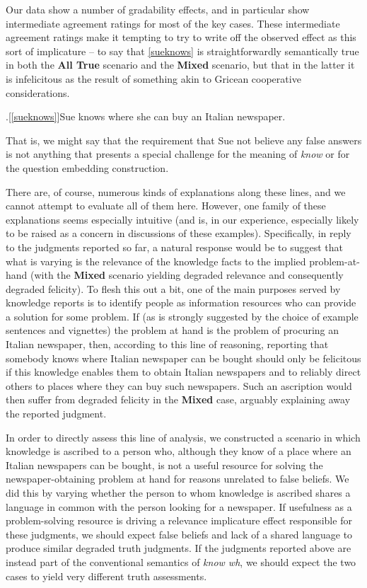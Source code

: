 \documentclass[a4paper]{article}
\begin{document}
Our data show a number of gradability effects, and in particular show intermediate agreement ratings for most of the key cases. These intermediate agreement ratings make it tempting to try to write off the observed effect as this sort of implicature -- to say that \ref{sueknows} is straightforwardly semantically true in both the \textbf{All True} scenario and the \textbf{Mixed} scenario, but that in the latter it is infelicitous as the result of something akin to Gricean cooperative considerations.

\ex.[\ref{sueknows}]Sue knows where she can buy an Italian newspaper.

That is, we might say that the requirement that Sue not believe any false answers is not anything that presents a special challenge for the meaning of \textit{know} or for the question embedding construction.

There are, of course, numerous kinds of explanations along these lines, and we cannot attempt to evaluate all of them here. However, one family of these explanations seems especially intuitive (and is, in our experience, especially likely to be raised as a concern in discussions of these examples). Specifically, in reply to the judgments reported so far, a natural response would be to suggest that what is varying is the relevance of the knowledge facts to the implied problem-at-hand (with the \textbf{Mixed} scenario yielding degraded relevance and consequently degraded felicity). To flesh this out a bit, one of the main purposes served by knowledge reports is to identify people as information resources who can provide a solution for some problem. If (as is strongly suggested by the choice of example sentences and vignettes) the problem at hand is the problem of procuring an Italian newspaper, then, according to this line of reasoning, reporting that somebody knows where Italian newspaper can be bought should only be felicitous if this knowledge enables them to obtain Italian newspapers and to reliably direct others to places where they can buy such newspapers. Such an ascription would then suffer from degraded felicity in the \textbf{Mixed} case, arguably explaining away the reported judgment. 

In order to directly assess this line of analysis, we constructed a scenario in which knowledge is ascribed to a person who, although they know of a place where an Italian newspapers can be bought, is not a useful resource for solving the newspaper-obtaining problem at hand for reasons unrelated to false beliefs. We did this by varying whether the person to whom knowledge is ascribed shares a language in common with the person looking for a newspaper. If usefulness as a problem-solving resource is driving a relevance implicature effect responsible for these judgments, we should expect false beliefs and lack of a shared language to produce similar degraded truth judgments. If the judgments reported above are instead part of the conventional semantics of \textit{know wh}, we should expect the two cases to yield very different truth assessments.
\end{document}

